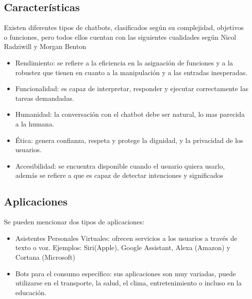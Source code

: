 \subsection{Características}
Existen diferentes tipos de chatbots, clasificados según su complejidad, objetivos o funciones,
pero todos ellos cuentan con las siguientes cualidades según Nicol Radziwill y Morgan Benton
\cite{evaluating_quality}
\begin{itemize}
	\item Rendimiento: se refiere a la eficiencia en la asignación de funciones y a la robustez que
	      tienen en cuanto a la manipulación y a las entradas inesperadas.
	\item Funcionalidad: es capaz de interpretar, responder y ejecutar	correctamente las tareas
	      demandadas.
	\item Humanidad: la conversación con el chatbot debe ser natural, lo mas parecida a la humana.
	\item Ética: genera confianza, respeta y protege la dignidad, y la privacidad de los usuarios.
	\item Accesibilidad: se encuentra disponible cuando el usuario quiera usarlo, además se refiere
	      a que es capaz de detectar intenciones y significados
\end{itemize}

\subsection{Aplicaciones}
Se pueden mencionar dos tipos de aplicaciones:
\begin{itemize}
	\item Asistentes Personales Virtuales: ofrecen servicios a los usuarios a través de texto o
	      voz. Ejemplos: Siri(Apple), Google Assistant, Alexa (Amazon) y Cortana (Microsoft)
	\item Bots para el consumo específico: sus aplicaciones son muy variadas, puede utilizarse en
	      el transporte, la salud, el clima, entretenimiento o incluso en la educación.
\end{itemize}

